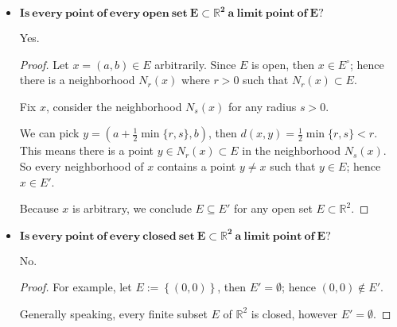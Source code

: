 \begin{Exercise}
\begin{itemize}
\item $\mathbf{Is\ every\ point\ of\ every\ open\ set\ E \subset \mathbb{R}^2\ a\ limit\ point\ of\ E?}$

Yes.
\begin{proof}
Let $x = (a, b)\in E$ arbitrarily. Since $E$ is open, then $x\in E^{\circ}$; hence there is a neighborhood $N_r(x)$ where $r>0$ such that $N_r(x)\subset E$.

Fix $x$, consider the neighborhood $N_s(x)$ for any radius $s>0$. 

We can pick $y = \left( a+\frac{1}{2}\min\{r,s\}, b \right)$, then $d(x,y) = \frac{1}{2}\min\{r,s\} < r$. This means there is a point $y\in N_r(x) \subset E$ in the neighborhood $N_s(x)$. So every neighborhood of $x$ contains a point $y\neq x$ such that $y\in E$; hence $x\in E'$.

Because $x$ is arbitrary, we conclude $E \subseteq E'$ for any open set $E\subset \mathbb{R}^2$.
\end{proof}

\item $\mathbf{Is\ every\ point\ of\ every\ closed\ set\ E \subset \mathbb{R}^2\ a\ limit\ point\ of\ E?}$

No.
\begin{proof}
For example, let $E := \left\{ (0,0) \right\}$, then $E' = \emptyset$; hence $(0,0)\notin E'$.

Generally speaking, every finite subset $E$ of $\mathbb{R}^2$ is closed, however $E' = \emptyset$. 
\end{proof}
\end{itemize}
\end{Exercise}